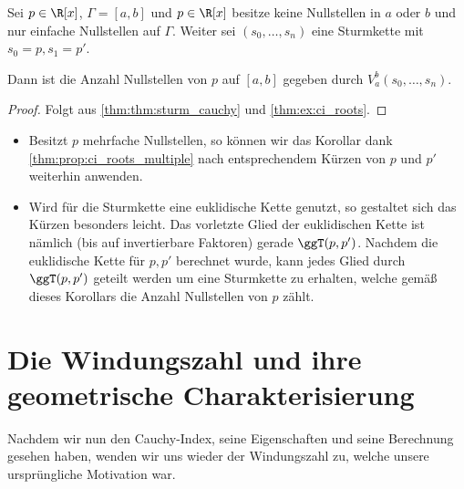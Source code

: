 \documentclass{mythesis}
\begin{document}
\begin{corollary} \label{thm:cor:sturm}
    Sei $p \in \R[x]$, $\Gamma = [a,b]$ und $p \in \R[x]$ besitze keine Nullstellen in $a$ oder $b$ und nur einfache Nullstellen auf $\Gamma$.
    Weiter sei $(s_0, \dotsc, s_n)$ eine Sturmkette mit $s_0 = p, s_1 = p'$.

    Dann ist die Anzahl Nullstellen von $p$ auf $[a,b]$ gegeben durch $V_a^b(s_0, \dotsc, s_n)$.
    \begin{proof}
        Folgt aus \ref{thm:thm:sturm_cauchy} und \ref{thm:ex:ci_roots}.
    \end{proof}
    \begin{note}
        \begin{itemize}
            \item
                Besitzt $p$ mehrfache Nullstellen, so können wir das Korollar dank \ref{thm:prop:ci_roots_multiple} nach entsprechendem Kürzen von $p$ und $p'$ weiterhin anwenden.
            \item
                Wird für die Sturmkette eine euklidische Kette genutzt, so gestaltet sich das Kürzen besonders leicht.
                Das vorletzte Glied der euklidischen Kette ist nämlich (bis auf invertierbare Faktoren) gerade $\ggT(p, p')$.
                Nachdem die euklidische Kette für $p, p'$ berechnet wurde, kann jedes Glied durch $\ggT(p, p')$ geteilt werden um eine Sturmkette zu erhalten, welche gemäß dieses Korollars die Anzahl Nullstellen von $p$ zählt.
        \end{itemize}
    \end{note}
\end{corollary}


\section{Die Windungszahl und ihre geometrische Charakterisierung} \label{sec:wn_geom}

Nachdem wir nun den Cauchy-Index, seine Eigenschaften und seine Berechnung gesehen haben, wenden wir uns wieder der Windungszahl zu, welche unsere ursprüngliche Motivation war.
\end{document}

